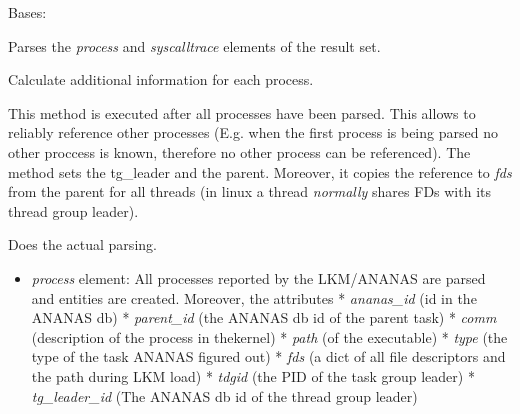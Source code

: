 \documentclass[letterpaper,10pt,english]{sphinxmanual}
\begin{document}
\begin{fulllineitems}
\label{ambrosia_plugins.lkm:ambrosia_plugins.lkm.LkmPluginParser}
Bases: {\hyperref[ambrosia:ambrosia.ResultParser]{}}

Parses the \emph{process} and \emph{syscalltrace} elements of the result set.

\begin{fulllineitems}
\label{ambrosia_plugins.lkm:ambrosia_plugins.lkm.LkmPluginParser.finish}
Calculate additional information for each process.

This method is executed after all processes have been parsed. This allows to reliably reference other processes
(E.g. when the first process is being parsed no other proccess is known, therefore no other process can be
referenced). The method sets the tg\_leader and the parent. Moreover, it copies the reference to \emph{fds} from the
parent for all threads (in linux a thread \emph{normally} shares FDs with its thread group leader).

\end{fulllineitems}


\begin{fulllineitems}
\label{ambrosia_plugins.lkm:ambrosia_plugins.lkm.LkmPluginParser.parse}
Does the actual parsing.
\begin{itemize}
\item {} 
\emph{process} element: All processes reported by the LKM/ANANAS are parsed and
 entities are created. Moreover, the attributes
* \emph{ananas\_id} (id in the ANANAS db)
* \emph{parent\_id} (the ANANAS db id of the parent task)
* \emph{comm} (description of the process in thekernel)
* \emph{path} (of the executable)
* \emph{type} (the type of the task ANANAS figured out)
* \emph{fds} (a dict of all file descriptors and the path during LKM load)
* \emph{tdgid} (the PID of the task group leader)
* \emph{tg\_leader\_id} (The ANANAS db id of the thread group leader)


\end{itemize}
\end{fulllineitems}
\end{fulllineitems}
\end{document}
